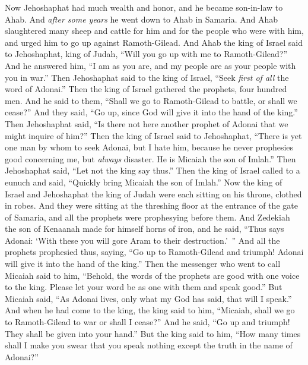 \begin{biblechapter} %
 Now Jehoshaphat had much wealth and honor, and he became son-in-law to Ahab.
\verse And \textit{after some years} he went down to Ahab in Samaria. And Ahab slaughtered many sheep and cattle for him and for the people who were with him, and urged him to go up against Ramoth-Gilead.
\verse And Ahab the king of Israel said to Jehoshaphat, king of Judah, “Will you go up with me to Ramoth-Gilead?” And he answered him, “I am as you are, and my people are as your people with you in war.”
\verse Then Jehoshaphat said to the king of Israel, “Seek \textit{first of all} the word of Adonai.”
\verse Then the king of Israel gathered the prophets, four hundred men. And he said to them, “Shall we go to Ramoth-Gilead to battle, or shall we cease?” And they said, “Go up, since God will give it into the hand of the king.”
\verse Then Jehoshaphat said, “Is there not here another prophet of Adonai that we might inquire of him?”
\verse Then the king of Israel said to Jehoshaphat, “There is yet one man by whom to seek Adonai, but I hate him, because he never prophesies good concerning me, but \textit{always} disaster. He is Micaiah the son of Imlah.” Then Jehoshaphat said, “Let not the king say thus.”
\verse Then the king of Israel called to a eunuch and said, “Quickly bring Micaiah the son of Imlah.”
\verse Now the king of Israel and Jehoshaphat the king of Judah were each sitting on his throne, clothed in robes. And they were sitting at the threshing floor at the entrance of the gate of Samaria, and all the prophets were prophesying before them.
\verse And Zedekiah the son of Kenaanah made for himself horns of iron, and he said, “Thus says Adonai: ‘With these you will gore Aram to their destruction.’ ”
\verse And all the prophets prophesied thus, saying, “Go up to Ramoth-Gilead and triumph! Adonai will give it into the hand of the king.”
\verse Then the messenger who went to call Micaiah said to him, “Behold, the words of the prophets are good with one voice to the king. Please let your word be as one with them and speak good.”
\verse But Micaiah said, “As Adonai lives, only what my God has said, that will I speak.”
\verse And when he had come to the king, the king said to him, “Micaiah, shall we go to Ramoth-Gilead to war or shall I cease?” And he said, “Go up and triumph! They shall be given into your hand.”
\verse But the king said to him, “How many times shall I make you swear that you speak nothing except the truth in the name of Adonai?”

\end{biblechapter}
